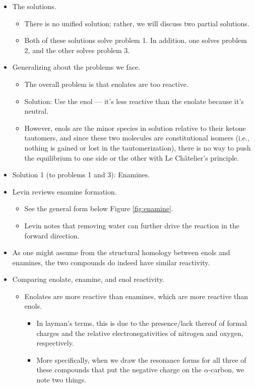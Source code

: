 \documentclass[../notes.tex]{subfiles}
\begin{document}
\begin{itemize}
    \item The solutions.
    \begin{itemize}
        \item There is no unified solution; rather, we will discuss two partial solutions.
        \item Both of these solutions solve problem 1. In addition, one solves problem 2, and the other solves problem 3.
    \end{itemize}
    \item Generalizing about the problems we face.
    \begin{itemize}
        \item The overall problem is that enolates are too reactive.
        \item Solution: Use the enol --- it's less reactive than the enolate because it's neutral.
        \item However, enols are the minor species in solution relative to their ketone tautomers, and since these two molecules are constitutional isomers (i.e., nothing is gained or lost in the tautomerization), there is no way to push the equilibrium to one side or the other with Le Ch\^{a}telier's principle.
    \end{itemize}
    \item Solution 1 (to problems 1 and 3): Enamines.
    \item Levin reviews enamine formation.
    \begin{itemize}
        \item See the general form below Figure \ref{fig:enamine}.
        \item Levin notes that removing water can further drive the reaction in the forward direction.
    \end{itemize}
    \item As one might assume from the structural homology between enols and enamines, the two compounds do indeed have similar reactivity.
    \item Comparing enolate, enamine, and enol reactivity.
    \begin{itemize}
        \item Enolates are more reactive than enamines, which are more reactive than enols.
        \begin{itemize}
            \item In layman's terms, this is due to the presence/lack thereof of formal charges and the relative electronegativities of nitrogen and oxygen, respectively.
            \item More specifically, when we draw the resonance forms for all three of these compounds that put the negative charge on the $\alpha$-carbon, we note two things.

\end{itemize}
\end{itemize}
\end{itemize}
\end{document}
